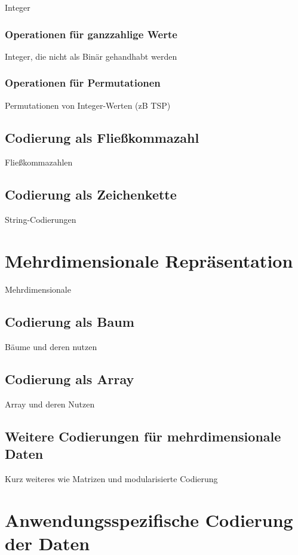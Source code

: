 \documentclass{llncs}
\begin{document}
Integer

\subsubsection{Operationen für ganzzahlige Werte}

Integer, die nicht als Binär gehandhabt werden

\subsubsection{Operationen für Permutationen}

Permutationen von Integer-Werten (zB TSP)

\subsection{Codierung als Fließkommazahl}

Fließkommazahlen

\subsection{Codierung als Zeichenkette}

String-Codierungen

\section{Mehrdimensionale Repräsentation}

Mehrdimensionale

\subsection{Codierung als Baum}

Bäume und deren nutzen

\subsection{Codierung als Array}

Array und deren Nutzen

\subsection{Weitere Codierungen für mehrdimensionale Daten}

Kurz weiteres wie Matrizen und modularisierte Codierung

\section{Anwendungsspezifische Codierung der Daten}
\end{document}
